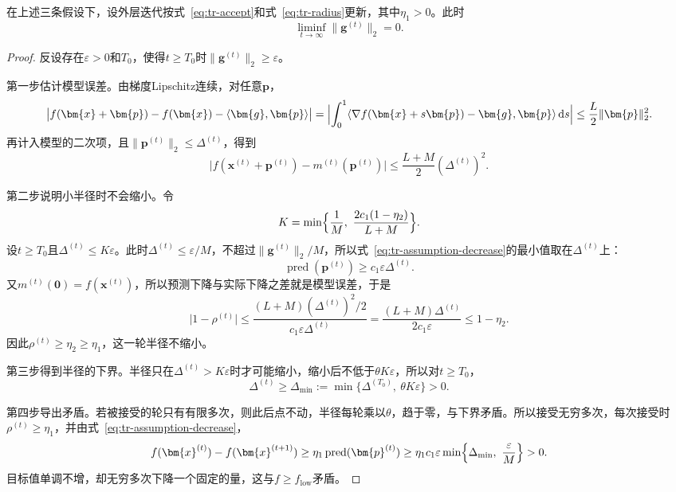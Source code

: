 \begin{theorem}[梯度的下极限为零]
 \label{thm:tr-first-order}
 在上述三条假设下，设外层迭代按式~\eqref{eq:tr-accept}和式~\eqref{eq:tr-radius}更新，其中$\eta_1>0$。此时
 \begin{equation}
  \liminf_{t\to\infty}\lVert\bm{g}^{(t)}\rVert_2=0.
  \label{eq:tr-liminf}
 \end{equation}
\end{theorem}

\begin{proof}
 反设存在$\varepsilon>0$和$T_0$，使得$t\geq T_0$时$\lVert\bm{g}^{(t)}\rVert_2\geq\varepsilon$。

 第一步估计模型误差。由梯度Lipschitz连续，对任意$\bm{p}$，
 \[
  \bigl\lvert f(\bm{x}+\bm{p})-f(\bm{x})-\langle\bm{g},\bm{p}\rangle\bigr\rvert
  =\Bigl\lvert\int_0^1\langle\nabla f(\bm{x}+s\bm{p})-\bm{g},\bm{p}\rangle\,\mathrm{d}s\Bigr\rvert
  \leq\frac{L}{2}\lVert\bm{p}\rVert_2^2.
 \]
 再计入模型的二次项，且$\lVert\bm{p}^{(t)}\rVert_2\leq\Delta^{(t)}$，得到
 \[
  \bigl\lvert f(\bm{x}^{(t)}+\bm{p}^{(t)})-m^{(t)}(\bm{p}^{(t)})\bigr\rvert\leq\frac{L+M}{2}(\Delta^{(t)})^2.
 \]

 第二步说明小半径时不会缩小。令
 \[
  K=\min\Bigl\{\frac1M,\ \frac{2c_1(1-\eta_2)}{L+M}\Bigr\}.
 \]
 设$t\geq T_0$且$\Delta^{(t)}\leq K\varepsilon$。此时$\Delta^{(t)}\leq\varepsilon/M$，不超过$\lVert\bm{g}^{(t)}\rVert_2/M$，所以式~\eqref{eq:tr-assumption-decrease}的最小值取在$\Delta^{(t)}$上：
 \[
  \operatorname{pred}(\bm{p}^{(t)})\geq c_1\varepsilon\Delta^{(t)}.
 \]
 又$m^{(t)}(\bm{0})=f(\bm{x}^{(t)})$，所以预测下降与实际下降之差就是模型误差，于是
 \[
  \lvert1-\rho^{(t)}\rvert\leq\frac{(L+M)(\Delta^{(t)})^2/2}{c_1\varepsilon\Delta^{(t)}}=\frac{(L+M)\Delta^{(t)}}{2c_1\varepsilon}\leq1-\eta_2.
 \]
 因此$\rho^{(t)}\geq\eta_2\geq\eta_1$，这一轮半径不缩小。

 第三步得到半径的下界。半径只在$\Delta^{(t)}>K\varepsilon$时才可能缩小，缩小后不低于$\theta K\varepsilon$，所以对$t\geq T_0$，
 \[
  \Delta^{(t)}\geq\Delta_{\min}:=\min\{\Delta^{(T_0)},\ \theta K\varepsilon\}>0.
 \]

 第四步导出矛盾。若被接受的轮只有有限多次，则此后点不动，半径每轮乘以$\theta$，趋于零，与下界矛盾。所以接受无穷多次，每次接受时$\rho^{(t)}\geq\eta_1$，并由式~\eqref{eq:tr-assumption-decrease}，
 \[
  f(\bm{x}^{(t)})-f(\bm{x}^{(t+1)})\geq\eta_1\operatorname{pred}(\bm{p}^{(t)})
  \geq\eta_1c_1\varepsilon\min\Bigl\{\Delta_{\min},\ \frac{\varepsilon}{M}\Bigr\}>0.
 \]
 目标值单调不增，却无穷多次下降一个固定的量，这与$f\geq f_{\mathrm{low}}$矛盾。
\end{proof}

